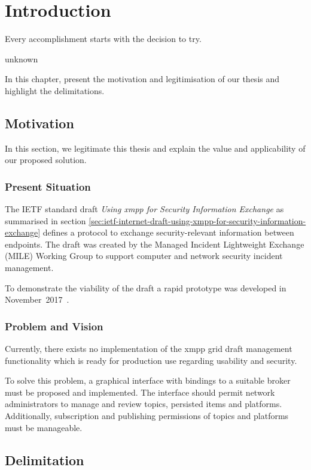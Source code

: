 \newcommand{\code}{\texttt}
\chapter{Introduction}
\label{sec:introduction}

\epigraph{Every accomplishment starts with the decision to try.}{unknown}
In this chapter, present the motivation and legitimisation of our thesis and highlight the delimitations.

\section{Motivation}
In this section, we legitimate this thesis and explain the value and applicability of our proposed solution.

\subsection{Present Situation}
The IETF standard draft \emph{Using \gls{xmpp} for Security Information Exchange} \cite{ietf-mile-xmpp-grid-05} as summarised in section \ref{sec:ietf-internet-draft-using-xmpp-for-security-information-exchange} defines a protocol to exchange security-relevant information between endpoints.
The draft was created by the Managed Incident Lightweight Exchange (MILE) Working Group to support computer and network security incident management.

To demonstrate the viability of the draft a rapid prototype was developed in November~2017~\cite{xmpp-grid-prototype}.

\subsection{Problem and Vision}
Currently, there exists no implementation of the \gls{xmpp} grid draft management functionality which is ready for production use regarding usability and security.

To solve this problem, a graphical interface with bindings to a suitable \gls{broker} must be proposed and implemented.
The interface should permit network administrators to manage and review \glspl{topic}, persisted items and \glspl{platform}.
Additionally, subscription and publishing permissions of \glspl{topic} and \glspl{platform} must be manageable.

\section{Delimitation} %
